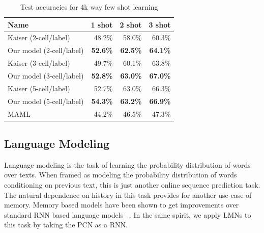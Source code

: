 \documentclass[letterpaper]{article} %
\begin{document}

\begin{table}[!htb]
\begin{center}
\begin{tabular}{|l|r|r|r|} \hline
Name &   1 shot &   2 shot &  3 shot \\ \hline
Kaiser (2-cell/label) & 48.2\%	&	58.0\%	&	60.3\% \\
Our model (2-cell/label) & \textbf{52.6\%}	&	\textbf{62.5\%}	&	\textbf{64.1\%} \\ \hline
Kaiser (3-cell/label) & 49.7\%	&	60.1\%	&	63.8\% \\
Our model (3-cell/label) & \textbf{52.8\%}	&	\textbf{63.0\%}	&	\textbf{67.0\%} \\ \hline
Kaiser (5-cell/label) & 52.7\%	&	63.0\%	&	66.3\% \\
Our model (5-cell/label) & \textbf{54.3\%}	&	\textbf{63.2\%}	&	\textbf{66.9\%} \\ \hline
MAML & 44.2\% & 46.5\% & 47.3\%  \\ \hline
\end{tabular}
\end{center}
\caption{\label{fewshot-results1} Test accuracies for 4k way few shot learning}

\end{table}





\subsection{Language Modeling}
Language modeling is the task of learning the probability distribution of words over texts. When framed as modeling the probability distribution of words conditioning on previous text, this is just another online sequence prediction task. The natural dependence on history in this task provides for another use-case of memory. Memory based models have been shown to get improvements over standard RNN based language models ~\cite{SukhbaatarSWF15,merity2016pointer,grave2016improving}.
In the same spirit, we apply LMNs to this task by taking the PCN as a RNN.
\end{document}
